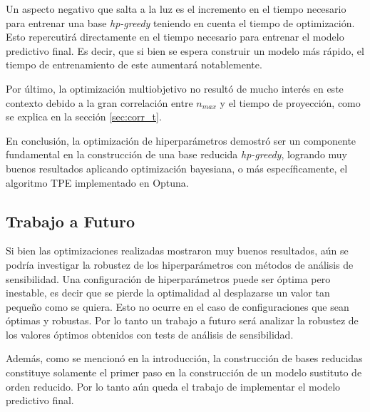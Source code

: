 Un aspecto negativo que salta a la luz es el incremento en el tiempo necesario para entrenar una base \textit{hp-greedy} teniendo en cuenta el tiempo de optimización. Esto repercutirá directamente en el tiempo necesario para entrenar el modelo predictivo final. Es decir, que si bien se espera construir un modelo más rápido, el tiempo de entrenamiento de este aumentará notablemente.

Por último, la optimización multiobjetivo no resultó de mucho interés en este contexto debido a la gran correlación entre $n_{max}$ y el tiempo de proyección, como se explica en la sección \ref{sec:corr_t}.


En conclusión, la optimización de hiperparámetros demostró ser un componente fundamental en la construcción de una base reducida \textit{hp-greedy}, logrando muy buenos resultados aplicando optimización bayesiana, o más específicamente, el algoritmo TPE implementado en Optuna.

\subsection*{Trabajo a Futuro}

Si bien las optimizaciones realizadas mostraron muy buenos resultados, aún se podría investigar la robustez de los hiperparámetros con métodos de análisis de sensibilidad. Una configuración de hiperparámetros puede ser óptima pero inestable, es decir que se pierde la optimalidad al desplazarse un valor tan pequeño como se quiera. Esto no ocurre en el caso de configuraciones que sean óptimas y robustas. Por lo tanto un trabajo a futuro será analizar la robustez de los valores óptimos obtenidos con tests de análisis de sensibilidad.


Además, como se mencionó en la introducción, la construcción de bases reducidas constituye solamente el primer paso en la construcción de un modelo sustituto de orden reducido. Por lo tanto aún queda el trabajo de implementar el modelo predictivo final.



